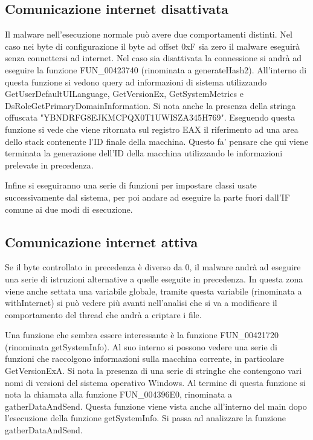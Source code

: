 \documentclass[a4paper,12pt]{article}
\begin{document}
\subsection{Comunicazione internet disattivata}
Il malware nell'esecuzione normale può avere due comportamenti distinti. Nel caso nei byte di configurazione il byte ad offset 0xF sia zero il malware eseguirà senza connettersi ad internet. 
Nel caso sia disattivata la connessione si andrà ad eseguire la funzione FUN\_00423740 (rinominata a generateHash2). All'interno di questa funzione si vedono query ad informazioni di sistema utilizzando GetUserDefaultUILanguage, GetVersionEx, GetSystemMetrics e DsRoleGetPrimaryDomainInformation. Si nota anche la presenza della stringa offuscata "YBNDRFG8EJKMCPQX0T1UWISZA345H769". Eseguendo questa funzione si vede che viene ritornata sul registro EAX il riferimento ad una area dello stack contenente l'ID finale della macchina. Questo fa' pensare che qui viene terminata la generazione dell'ID della macchina utilizzando le informazioni prelevate in precedenza.

Infine si eseguiranno una serie di funzioni per impostare classi usate successivamente dal sistema, per poi andare ad eseguire la parte fuori dall'IF comune ai due modi di esecuzione.  

\subsection{Comunicazione internet attiva}
Se il byte controllato in precedenza è diverso da 0, il malware andrà ad eseguire una serie di istruzioni alternative a quelle eseguite in precedenza.  In questa zona viene anche settata una variabile globale, tramite questa variabile (rinominata a withInternet) si può vedere più avanti nell'analisi che si va a modificare il comportamento del thread che andrà a criptare i file. 

Una funzione che sembra essere interessante è la funzione FUN\_00421720 (rinominata getSystemInfo). Al suo interno si possono vedere una serie di funzioni che raccolgono informazioni sulla macchina corrente, in particolare GetVersionExA. Si nota la presenza di una serie di stringhe che contengono vari nomi di versioni del sistema operativo Windows. Al termine di questa funzione si nota la chiamata alla funzione FUN\_004396E0, rinominata a gatherDataAndSend. Questa funzione viene vista anche all'interno del main dopo l'esecuzione della funzione getSystemInfo. Si passa ad analizzare la funzione gatherDataAndSend.
\end{document}
